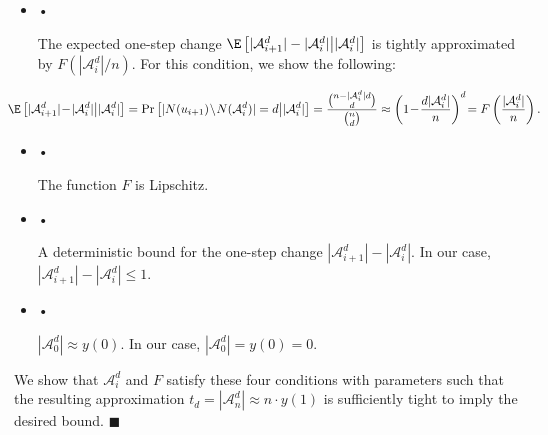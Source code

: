 \begin{itemize}


\item[] • 


The expected one-step change $\E\left[|\mathcal{A}^{d}_{i+1}|-|\mathcal{A}^{d}_{i}|\middle||\mathcal{A}^{d}_{i}|\right]$ is tightly approximated by $F\left(|\mathcal{A}^{d}_{i}|/n\right)$. For this condition, we show the following:\par


\[\begin{gathered}
\displaystyle\hskip-25.6073pt\E\left[|\mathcal{A}^{d}_{i+1}|\!-\!|\mathcal{A}^{d}_{i}|\middle||\mathcal{A}^{d}_{i}|\right]=\Pr\left[|N(u_{i+1})\!\setminus\!N(\mathcal{A}^{d}_{i})|=d\middle||\mathcal{A}^{d}_{i}|\right]=\frac{\binom{n-|\mathcal{A}^{d}_{i}|d}{d}}{\binom{n}{d}}\approx\left(1\!-\!\frac{d|\mathcal{A}^{d}_{i}|}{n}\right)^{d}\!=F\left(\frac{|\mathcal{A}^{d}_{i}|}{n}\right).
\end{gathered}\]




\item[] • 


The function $F$ is Lipschitz.\par




\item[] • 


A deterministic bound for the one-step change $|\mathcal{A}^{d}_{i+1}|-|\mathcal{A}^{d}_{i}|$. In our case, $|\mathcal{A}^{d}_{i+1}|-|\mathcal{A}^{d}_{i}|\leq 1$.\par




\item[] • 


$|\mathcal{A}^{d}_{0}|\approx y(0)$. In our case, $|\mathcal{A}^{d}_{0}|=y(0)=0$.\par




\end{itemize}


We show that $\mathcal{A}^{d}_{i}$ and $F$ satisfy these four conditions with parameters such that the resulting approximation $t_{d}=|\mathcal{A}^{d}_{n}|\approx n\cdot y(1)$ is sufficiently tight to imply the desired bound.
\ensuremath{\blacksquare}\par





